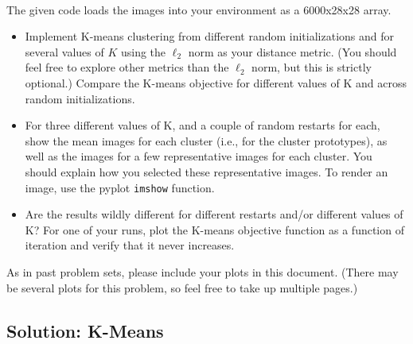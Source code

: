 \documentclass[submit]{harvardml}
\begin{document}
~
\begin{problem}
The given code loads the images into your environment as a 6000x28x28 array.

\begin{itemize}
    \item Implement K-means clustering
        from different random initializations and for several values of $K$ using the $\ell_2$ norm
        as your distance metric. (You should feel free to explore other metrics than the $\ell_2$
        norm, but this is strictly optional.)  Compare the K-means objective for different values of
        K and across random initializations.
%
\item For three different values of K,
    and a couple of random restarts for each, show the mean images for each cluster (i.e., for the
    cluster prototypes), as well as the images for a few representative images for each cluster. You
    should explain how you selected these representative images. To render an image, use the pyplot
    \texttt{imshow} function. 

\item Are the results wildly different for different restarts and/or different values of K?  For one
    of your runs, plot the K-means objective function as a function of iteration and verify that it
    never increases.

\end{itemize}


As in past problem sets, please include your plots in this
document. (There may be several plots for this problem, so feel free
to take up multiple pages.)




\end{problem}
\subsection*{Solution: K-Means}
\end{document}
